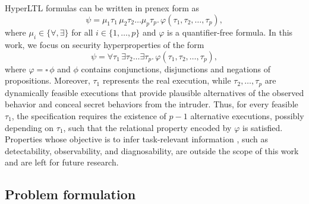 \documentclass[journal,twoside,web]{ieeecolor}
\begin{document}
HyperLTL formulas can be written in prenex form as
\begin{equation*} 
    \psi = \mu_1 \tau_1 \, \mu_2 \tau_2 \dots \mu_p \tau_p. \, \varphi(\tau_1, \tau_2, \dots, \tau_p), 
\end{equation*}
where $\mu_i \in \{\forall, \exists\}$ for all $i \in \{1, \dots, p\}$ and $\varphi$ is a quantifier-free formula. In this work, we focus on security hyperproperties of the form
\begin{equation} \label{eq:security_hyperltl}
    \psi = \forall \tau_1 \, \exists \tau_2 \dots \exists \tau_p. \, \varphi(\tau_1, \tau_2, \dots, \tau_p), 
\end{equation}
where $\varphi = \square \, \phi$ and $\phi$ contains conjunctions, disjunctions and negations of propositions. Moreover, $\tau_1$ represents the real execution, while $\tau_2,\dots,\tau_p$ are dynamically feasible executions that provide plausible alternatives of the observed behavior and conceal secret behaviors from the intruder. Thus, for every feasible $\tau_1$, the specification requires the existence of $p-1$ alternative executions, possibly depending on $\tau_1$, such that the relational property encoded by $\varphi$ is satisfied. Properties whose objective is to infer task-relevant information \cite{cui2026}, such as detectability, observability, and diagnosability, are outside the scope of this work and are left for future research.

\subsection{Problem formulation}
\end{document}

